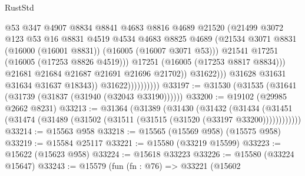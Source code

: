\begin{lexlean}{RustStd}
\begin{coremodule}
                                        @53
                                        @347
                                        @4907
                                        @8834
                                        @8841
                                        @4683
                                        @8816
                                        @4689
                                        @21520
                                        (@21499
                                          @3072
                                          @123
                                          @53
                                          @16
                                          @8831
                                          @4519
                                          @4534
                                          @4683
                                          @8825
                                          @4689
                                          (@21534
                                            @3071
                                            @8831
                                            (@16000 (@16001 @8831))
                                            (@16005 (@16007 @3071 @53)))
                                          @21541
                                          @17251
                                          (@16005 (@17253 @8826 @4519)))
                                        @17251
                                        (@16005 (@17253 @8817 @8834)))
                                      @21681
                                      @21684
                                      @21687
                                      @21691
                                      @21696
                                      @21702))
                                  @31622)))
                            @31628
                            @31631
                            @31634
                            @31637
                            @18343))
                        @31622))))))))))
@33197 := @31530 (@31535 (@31641 (@31739 (@31837 (@31940 (@32043 @33190))))))
@33200 := @19102 (@29985 @2662 @8231)
@33213 := @31364
    (@31389
      (@31430
        (@31432
          (@31434 (@31451 (@31474 (@31489 (@31502 (@31511 (@31515 (@31520 (@33197 @33200))))))))))))
@33214 := @15563 @958
@33218 := @15565 (@15569 @958) (@15575 @958)
@33219 := @15584 @25117
@33221 := @15580 (@33219 @15599)
@33223 := @15622 (@15623 @958)
@33224 := @15618 @33223
@33226 := @15580 (@33224 @15647)
@33243 := @15579
    (fun (fn : @76) =>
    @33221
      (@15602

\end{coremodule}
\end{lexlean}
